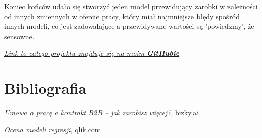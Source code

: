 \documentclass[a4paper]{article}
\begin{document}
\quad Koniec końców udało się stworzyć jeden model przewidujący zarobki w zależności od
innych zmiennych w ofercie pracy, który miał najmniejsze błędy spośród innych modeli, co jest
zadowalające a przewidywane wartości są 'powiedzmy', że sensowne.\newline

\begin{center}
    \href{https://github.com/lukaszfabia/RaportIT}{\textit{Link to całego projektu znajduje się na moim \textbf{GitHubie}}}
\end{center}


\section{Bibliografia}

\begin{thebibliography}{9}
    \href{https://bizky.ai/blog/umowa-o-prace-a-kontrakt-b2b-co-sie-bardziej-oplaca/}{\textit{Umowa o pracę a kontrakt B2B – jak zarobisz więcej?}}, bizky.ai

    \href{https://help.qlik.com/pl-PL/cloud-services/Subsystems/Hub/Content/Sense_Hub/AutoML/scoring-regression.htm}{\textit{Ocena modeli regresji}}, qlik.com
\end{thebibliography}
\end{document}
